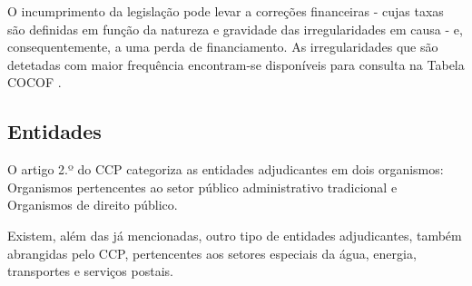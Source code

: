 O incumprimento da legislação pode levar a correções financeiras - cujas taxas são definidas em função da natureza e gravidade das irregularidades em causa - e, consequentemente, a uma perda de financiamento. As irregularidades que são detetadas com maior frequência encontram-se disponíveis para consulta na Tabela COCOF \cite{corrections}.





\subsection{Entidades}

O artigo 2.º do CCP categoriza as entidades adjudicantes em dois organismos: Organismos pertencentes ao setor público administrativo tradicional e Organismos de direito público.


\begin{table}[h!]
	
	\centering
	\setlength{\tabcolsep}{15pt}
	\setlength\cellspacetoplimit{0.5cm} 
	\setlength\cellspacebottomlimit{0.5cm} 
	\renewcommand{\arraystretch}{1.5}

	
	\caption{Categorização das Entidades Adjudicantes}
	\label{table:1}
\end{table}



Existem, além das já mencionadas, outro tipo de entidades adjudicantes, também abrangidas pelo CCP, pertencentes aos setores especiais da água, energia, transportes e serviços postais. 

